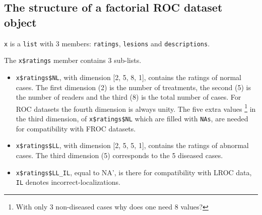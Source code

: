 \documentclass[
]{book}
\newenvironment{Shaded}{\begin{snugshade}}{\end{snugshade}}
\newcommand{\AttributeTok}[1]{\textcolor[rgb]{0.77,0.63,0.00}{#1}}
\newcommand{\CommentTok}[1]{\textcolor[rgb]{0.56,0.35,0.01}{\textit{#1}}}
\newcommand{\DecValTok}[1]{\textcolor[rgb]{0.00,0.00,0.81}{#1}}
\newcommand{\FunctionTok}[1]{\textcolor[rgb]{0.00,0.00,0.00}{#1}}
\newcommand{\NormalTok}[1]{#1}
\newcommand{\SpecialCharTok}[1]{\textcolor[rgb]{0.00,0.00,0.00}{#1}}
\begin{document}
\hypertarget{dataset-object-details-structure-roc-dataset}{%
\subsection{The structure of a factorial ROC dataset object}\label{dataset-object-details-structure-roc-dataset}}

\texttt{x} is a \texttt{list} with 3 members: \texttt{ratings}, \texttt{lesions} and \texttt{descriptions}.

\begin{Shaded}
\end{Shaded}

The \texttt{x\$ratings} member contains 3 sub-lists.

\begin{Shaded}
\end{Shaded}

\begin{itemize}
\item
  \texttt{x\$ratings\$NL}, with dimension {[}2, 5, 8, 1{]}, contains the ratings of normal cases. The first dimension (2) is the number of treatments, the second (5) is the number of readers and the third (8) is the total number of cases. For ROC datasets the fourth dimension is always unity. The five extra values \footnote{With only 3 non-diseased cases why does one need 8 values?} in the third dimension, of \texttt{x\$ratings\$NL} which are filled with \texttt{NAs}, are needed for compatibility with FROC datasets.
\item
  \texttt{x\$ratings\$LL}, with dimension {[}2, 5, 5, 1{]}, contains the ratings of abnormal cases. The third dimension (5) corresponds to the 5 diseased cases.
\item
  \texttt{x\$ratings\$LL\_IL}, equal to NA', is there for compatibility with LROC data, \texttt{IL} denotes incorrect-localizations.
\end{itemize}
\end{document}
